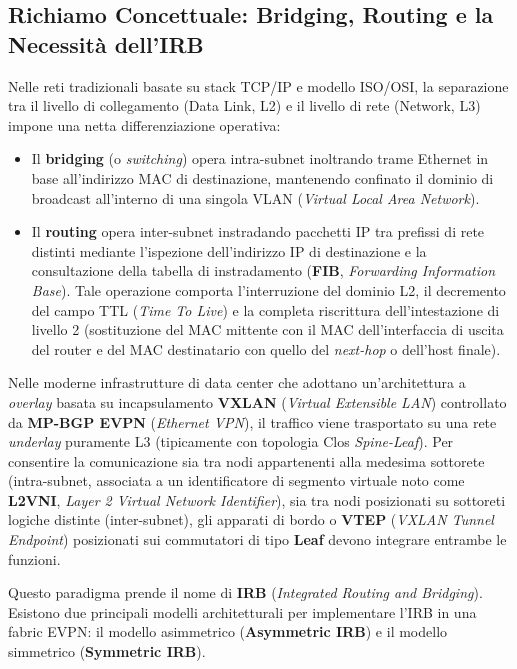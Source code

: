 \documentclass[11pt, a4paper]{article}
\begin{document}
\subsection{Richiamo Concettuale: Bridging, Routing e la Necessità dell'IRB}
Nelle reti tradizionali basate su stack TCP/IP e modello ISO/OSI, la separazione tra il livello di collegamento (Data Link, L2) e il livello di rete (Network, L3) impone una netta differenziazione operativa:
\begin{itemize}[noitemsep]
    \item Il \textbf{bridging} (o \emph{switching}) opera intra-subnet inoltrando trame Ethernet in base all'indirizzo MAC di destinazione, mantenendo confinato il dominio di broadcast all'interno di una singola VLAN (\emph{Virtual Local Area Network}).
    \item Il \textbf{routing} opera inter-subnet instradando pacchetti IP tra prefissi di rete distinti mediante l'ispezione dell'indirizzo IP di destinazione e la consultazione della tabella di instradamento (\textbf{FIB}, \emph{Forwarding Information Base}). Tale operazione comporta l'interruzione del dominio L2, il decremento del campo TTL (\emph{Time To Live}) e la completa riscrittura dell'intestazione di livello 2 (sostituzione del MAC mittente con il MAC dell'interfaccia di uscita del router e del MAC destinatario con quello del \emph{next-hop} o dell'host finale).
\end{itemize}

Nelle moderne infrastrutture di data center che adottano un'architettura a \emph{overlay} basata su incapsulamento \textbf{VXLAN} (\emph{Virtual Extensible LAN}) controllato da \textbf{MP-BGP EVPN} (\emph{Ethernet VPN}), il traffico viene trasportato su una rete \emph{underlay} puramente L3 (tipicamente con topologia Clos \emph{Spine-Leaf}). Per consentire la comunicazione sia tra nodi appartenenti alla medesima sottorete (intra-subnet, associata a un identificatore di segmento virtuale noto come \textbf{L2VNI}, \emph{Layer 2 Virtual Network Identifier}), sia tra nodi posizionati su sottoreti logiche distinte (inter-subnet), gli apparati di bordo o \textbf{VTEP} (\emph{VXLAN Tunnel Endpoint}) posizionati sui commutatori di tipo \textbf{Leaf} devono integrare entrambe le funzioni.

Questo paradigma prende il nome di \textbf{IRB} (\emph{Integrated Routing and Bridging}). Esistono due principali modelli architetturali per implementare l'IRB in una fabric EVPN: il modello asimmetrico (\textbf{Asymmetric IRB}) e il modello simmetrico (\textbf{Symmetric IRB}).
\end{document}
